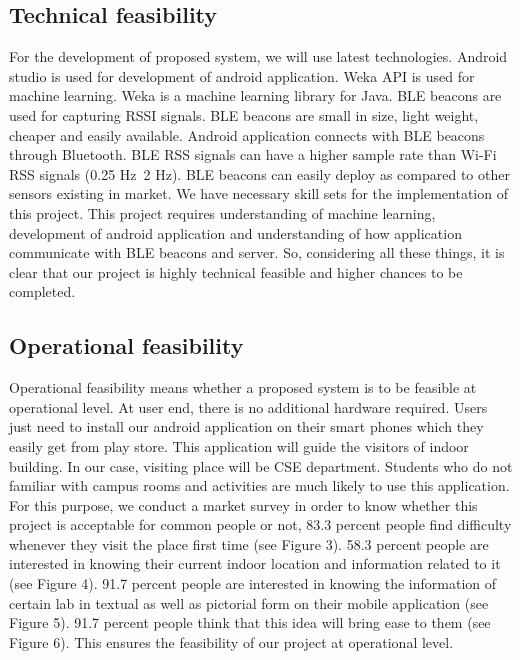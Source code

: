 \documentclass{article}
\begin{document}
\subsection{Technical feasibility}
For the development of proposed system, we will use latest technologies. Android studio is used for development of android application. Weka API is used for machine learning. Weka is a machine learning library for Java. BLE beacons are used for capturing RSSI signals. BLE beacons are small in size, light weight, cheaper and easily available. Android application\cite{Localization} connects with BLE beacons through Bluetooth. BLE RSS signals can have a higher sample rate than Wi-Fi RSS signals (0.25 Hz~2 Hz). BLE beacons can easily deploy as compared to other sensors existing in market. We have necessary skill sets for the implementation of this project. This project requires understanding of machine learning, development of android application and understanding of how application communicate with BLE beacons and server. So, considering all these things, it is clear that our project is highly technical feasible and higher chances to be completed.
\subsection{Operational feasibility}
Operational feasibility means whether a proposed system is to be feasible at operational level. At user end, there is no additional hardware required. Users just need to install our android application on their smart phones which they easily get from play store. This application will guide the visitors of indoor building. In our case, visiting place will be CSE department. Students who do not familiar with campus rooms and activities are much likely to use this application. For this purpose, we conduct a market survey in order to know whether this project is acceptable for common people or not, 83.3 percent people find difficulty whenever they visit the place first time (see Figure 3). 58.3 percent people are interested in knowing their current indoor location and information related to it (see Figure 4). 91.7 percent people are interested in knowing the information of certain lab in textual as well as pictorial form on their mobile application (see Figure 5). 91.7 percent people think that this idea will bring ease to them (see Figure 6). This ensures the feasibility of our project at operational level.
\\
\\
\end{document}
